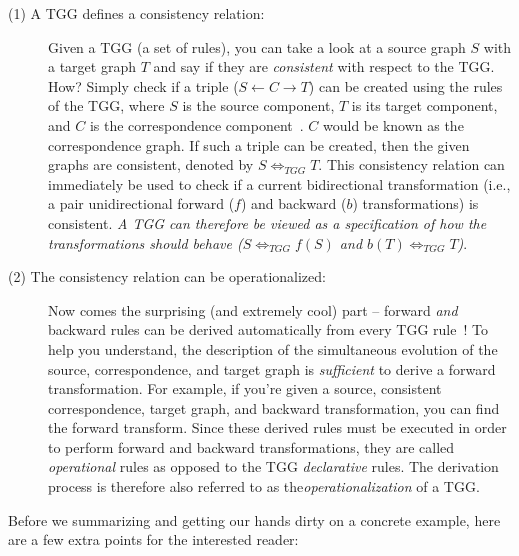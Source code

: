 \begin{description}

\item[(1) A TGG defines a consistency relation:]%
Given a TGG (a set of rul\-es), you can take a look at a source graph $S$ with a target graph $T$ and say if
they are \emph{consistent} with respect to the TGG. How?  Simply check if a triple ($S\leftarrow C\rightarrow T$) can be created using the rules of the TGG,
where $S$ is the source component, $T$ is its target component, and $C$ is the correspondence component~\cite{Hermann2011a}. $C$ would be known as the
correspondence graph. If such a triple can be created, then the given graphs are consistent, denoted by $S \Leftrightarrow_{TGG} T$. This consistency relation
can immediately be used to check if a current bidirectional transformation (i.e., a pair unidirectional forward ($f$) and backward ($b$) transformations) is
consistent. \emph{A TGG can therefore be viewed as a specification of how the transformations \emph{should} behave ($S \Leftrightarrow_{TGG} f(S)$ and $b(T)
\Leftrightarrow_{TGG} T$)}.
	
\item[(2) The consistency relation can be operationalized:]%
Now comes the surprising (and extremely cool) part -- forward \emph{and} backward rules can be derived automatically from every TGG
rule~\cite{Giese2010,Hermann2011a}! To help you understand, the description of the simultaneous evolution of the source, correspondence, and target graph is
\emph{sufficient} to derive a forward transformation. For example, if you're given a source, consistent correspondence, target graph, and backward
transformation, you can find the forward transform. Since these derived rules must be executed in order to perform forward and backward transformations, they
are called \emph{operational} rules as opposed to the TGG \emph{declarative} rules. The derivation process is therefore also referred to as
the\emph{operationalization} of a TGG.
	
\end{description}

Before we summarizing and getting our hands dirty on a concrete example, here are a few extra points for the interested reader:  

